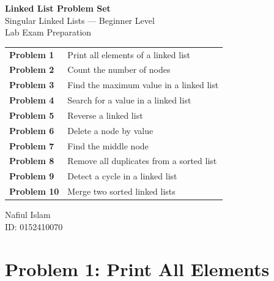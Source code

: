 \documentclass[12pt, a4paper]{article}
\begin{document}
\thispagestyle{empty}

\vspace*{3cm}
\begin{center}
  {\LARGE \textbf{Linked List Problem Set}}\\[0.5em]
  {\large Singular Linked Lists --- Beginner Level}\\[0.3em]
  {\small Lab Exam Preparation}
\end{center}

\vspace{1.5cm}

\begin{center}
\begin{tabular}{ll}
  \textbf{Problem 1}  & Print all elements of a linked list \\[4pt]
  \textbf{Problem 2}  & Count the number of nodes \\[4pt]
  \textbf{Problem 3}  & Find the maximum value in a linked list \\[4pt]
  \textbf{Problem 4}  & Search for a value in a linked list \\[4pt]
  \textbf{Problem 5}  & Reverse a linked list \\[4pt]
  \textbf{Problem 6}  & Delete a node by value \\[4pt]
  \textbf{Problem 7}  & Find the middle node \\[4pt]
  \textbf{Problem 8}  & Remove all duplicates from a sorted list \\[4pt]
  \textbf{Problem 9}  & Detect a cycle in a linked list \\[4pt]
  \textbf{Problem 10} & Merge two sorted linked lists \\
\end{tabular}
\end{center}

\vfill

\begin{flushright}
  \small Nafiul Islam\\
  \small ID: 0152410070
\end{flushright}

\newpage


\section*{Problem 1: Print All Elements}
\end{document}
